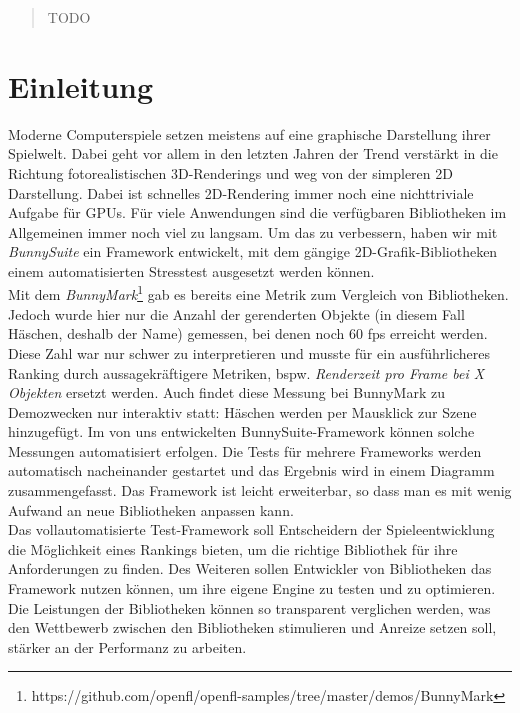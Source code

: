 \begin{abstract}
TODO
\end{abstract}

\chapter{Einleitung}
Moderne Computerspiele setzen meistens auf eine graphische Darstellung ihrer Spielwelt. Dabei geht vor allem in den letzten Jahren der Trend  verstärkt in die Richtung fotorealistischen 3D-Renderings und weg von der simpleren 2D Darstellung.
Dabei ist schnelles 2D-Rendering immer noch eine nichttriviale Aufgabe für GPUs. Für viele Anwendungen sind die verfügbaren Bibliotheken im Allgemeinen immer noch viel zu langsam. Um das zu verbessern, haben wir mit \textit{BunnySuite} ein Framework entwickelt, mit dem gängige 2D-Grafik-Bibliotheken einem automatisierten Stresstest ausgesetzt werden können.\\
Mit dem \textit{BunnyMark}\footnote{https://github.com/openfl/openfl-samples/tree/master/demos/BunnyMark} gab es bereits eine Metrik zum Vergleich von Bibliotheken. Jedoch wurde hier nur die Anzahl der gerenderten Objekte (in diesem Fall Häschen, deshalb der Name) gemessen, bei denen noch 60 fps erreicht werden. Diese Zahl war nur schwer zu interpretieren und musste für ein ausführlicheres Ranking durch aussagekräftigere Metriken, bspw. \textit{Renderzeit pro Frame bei X Objekten} ersetzt werden. Auch findet diese Messung bei BunnyMark zu Demozwecken nur interaktiv statt: Häschen werden per Mausklick zur Szene hinzugefügt. Im von uns entwickelten BunnySuite-Framework können solche Messungen automatisiert erfolgen. Die Tests für mehrere Frameworks werden automatisch nacheinander gestartet und das Ergebnis wird in einem Diagramm zusammengefasst. Das Framework ist leicht erweiterbar, so dass man es mit wenig Aufwand an neue Bibliotheken anpassen kann.\\
Das vollautomatisierte Test-Framework soll Entscheidern der Spieleentwicklung die Möglichkeit eines Rankings bieten, um die richtige Bibliothek für ihre Anforderungen zu finden. Des Weiteren sollen Entwickler von Bibliotheken das Framework nutzen können, um ihre eigene Engine zu testen und zu optimieren. Die Leistungen der Bibliotheken können so transparent verglichen werden, was den Wettbewerb zwischen den Bibliotheken stimulieren und Anreize setzen soll, stärker an der Performanz zu arbeiten.

